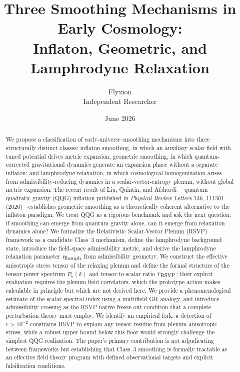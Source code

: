 \documentclass[12pt, a4paper]{article}
\title{\textbf{Three Smoothing Mechanisms in Early Cosmology:\\
Inflaton, Geometric, and Lamphrodyne Relaxation}}
\author{Flyxion\\[4pt]
\small Independent Researcher}
\date{June 2026}
\newcommand{\etalamph}{\eta_{\rm lamph}}
\newcommand{\rRSVP}{r_{\rm RSVP}}
\newcommand{\Ph}{P_h}
\begin{document}
\maketitle

\begin{abstract}
We propose a classification of early-universe smoothing mechanisms into three
structurally distinct classes: inflaton smoothing, in which an auxiliary scalar
field with tuned potential drives metric expansion; geometric smoothing, in which
quantum-corrected gravitational dynamics generate an expansion phase without a
separate inflaton; and lamphrodyne relaxation, in which cosmological homogenization
arises from admissibility-reducing dynamics in a scalar-vector-entropy plenum,
without global metric expansion. The recent result of Liu, Quintin, and Afshordi---
quantum quadratic gravity (QQG) inflation published in \textit{Physical Review
Letters} 136, 111501 (2026)---establishes geometric smoothing as a theoretically
coherent alternative to the inflaton paradigm. We treat QQG as a rigorous benchmark
and ask the next question: if smoothing can emerge from quantum gravity alone, can
it emerge from relaxation dynamics alone? We formalize the Relativistic
Scalar-Vector Plenum (RSVP) framework as a candidate Class~3 mechanism, define the
lamphrodyne background state, introduce the field-space admissibility metric, and
derive the lamphrodyne relaxation parameter $\etalamph$ from admissibility geometry.
We construct the effective anisotropic stress tensor of the relaxing plenum and
define the formal structure of the tensor power spectrum $\Ph(k)$ and
tensor-to-scalar ratio $\rRSVP$; their explicit evaluation requires the plenum
field correlators, which the prototype action makes calculable in principle but
which are not derived here. We provide a phenomenological estimate of the scalar
spectral index using a multifield GR analogy, and introduce admissibility crossing
as the RSVP-native freeze-out condition that a complete perturbation theory must
employ. We identify an empirical fork: a detection of $r > 10^{-2}$ constrains
RSVP to explain any tensor residue from plenum anisotropic stress, while a robust
upper bound below this floor would strongly challenge the simplest QQG realization.
The paper's primary contribution is not adjudicating between frameworks but
establishing that Class~3 smoothing is formally tractable as an effective field
theory program with defined observational targets and explicit falsification
conditions.
\end{abstract}
\end{document}
